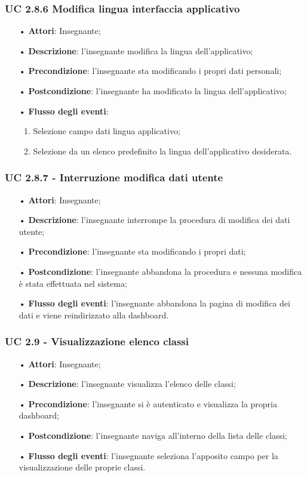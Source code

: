 \subsubsection{UC 2.8.6 Modifica lingua interfaccia applicativo}
\begin{itemize}
	\item[•]\textbf{Attori}: Insegnante;
	\item[•]\textbf{Descrizione}: l'insegnante modifica la lingua dell'applicativo;
	\item[•]\textbf{Precondizione}: l'insegnante sta modificando i propri dati personali;
	\item[•]\textbf{Postcondizione}: l'insegnante ha modificato la lingua dell'applicativo; 
	\item[•]\textbf{Flusso degli eventi}: 
	\begin{enumerate}
		\item Selezione campo dati lingua applicativo;
		\item Selezione da un elenco predefinito la lingua dell'applicativo desiderata.
	\end{enumerate}
\end{itemize}

\subsubsection{UC 2.8.7 - Interruzione modifica dati utente}
\begin{itemize}
	\item[•]\textbf{Attori}: Insegnante;
	\item[•]\textbf{Descrizione}: l'insegnante interrompe la procedura di modifica dei dati utente;
	\item[•]\textbf{Precondizione}: l'insegnante sta modificando i propri dati;
	\item[•]\textbf{Postcondizione}: l'insegnante abbandona la procedura e nessuna modifica è stata effettuata nel sistema; 
	\item[•]\textbf{Flusso degli eventi}: l'insegnante abbandona la pagina di modifica dei dati e viene reindirizzato alla dashboard.
\end{itemize}


\subsubsection{UC 2.9 - Visualizzazione elenco classi}
\begin{itemize}
	\item[•] \textbf{Attori}: Insegnante;
	\item[•] \textbf{Descrizione}: l'insegnante visualizza l'elenco delle classi;
	\item[•] \textbf{Precondizione}: l'insegnante si è autenticato e visualizza la propria dashboard;
	\item[•] \textbf{Postcondizione}: l'insegnante naviga all'interno della lista delle classi;
	\item[•] \textbf{Flusso degli eventi}: l'insegnante seleziona l'apposito campo per la visualizzazione delle proprie classi.
\end{itemize}

